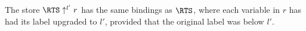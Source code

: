 The store $\RTS\uparrow^{l'} r$ has the same
bindings as $\RTS$, where each variable in $r$ has had its label
upgraded to $l'$, provided that the original label was below $l'$.


%
%



